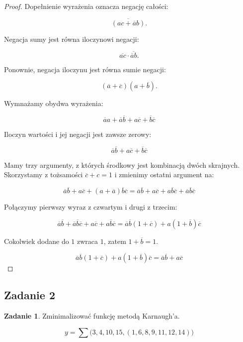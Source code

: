 \documentclass[11pt]{article}
\theoremstyle{definition}
\newtheorem{zadanie}{Zadanie}
\begin{document}
\begin{proof}
Dopełnienie wyrażenia oznacza negację całości:

$$\overline{(ac+ \overline ab)}.$$

Negacja sumy jest równa iloczynowi negacji:

$$\overline{ac} \cdot \overline{\overline a b}.$$

Ponownie, negacja iloczynu jest równa sumie negacji:

$$(\overline a+\overline c)(a+\overline b).$$

Wymnażamy obydwa wyrażenia:

$$\overline aa+ \overline a\overline b + a\overline c + \overline b\overline c$$

Iloczyn wartości i jej negacji jest zawsze zerowy:

$$\overline a\overline b + a\overline c + \overline b\overline c$$

Mamy trzy argumenty, z których środkowy jest kombinacją dwóch skrajnych. Skorzystamy z tożsamości $\overline c + c = 1$ i zmienimy ostatni argument na:

$$
\overline a\overline b + a\overline c + (a+\overline a)\overline b\overline c
=
\overline a\overline b + a\overline c + a\overline b\overline c + \overline a\overline b\overline c
$$

Połączymy pierwszy wyraz z czwartym i drugi z trzecim:

$$\overline a\overline b+ \overline a\overline b\overline c + a\overline c + a\overline b\overline c = \overline a\overline b(1+\overline c) + a(1+\overline b)\overline c$$

Cokolwiek dodane do $1$ zwraca $1$, zatem $1+\overline b = 1$.

$$ \overline a\overline b(1+\overline c) + a(1+\overline b)\overline c =  \overline a\overline b + a\overline c$$


\end{proof}


\subsection{Zadanie 2}
\begin{zadanie}
Zminimalizować funkcję metodą Karnaugh'a.

$$y = \sum \big(3,4,10,15,(1,6,8,9,11,12,14)\big)$$
\end{zadanie}
\end{document}

